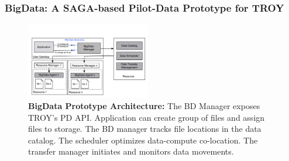 \subsubsection*{BigData: A SAGA-based Pilot-Data Prototype for TROY}
\label{sec:bigdata}

\begin{figure}[t]
    \centering
    \includegraphics[width=0.48\textwidth]{figures/pilot-data-manager.pdf}
    \caption{\textbf{BigData Prototype Architecture:} The BD Manager
      exposes TROY's PD API. Application can create group of files and
      assign files to storage. The BD manager tracks file locations in
      the data catalog. The scheduler optimizes data-compute
      co-location.  The transfer manager initiates and monitors data
      movements. \up\up}
    \label{fig:pilot-data-architecture}
\end{figure}



